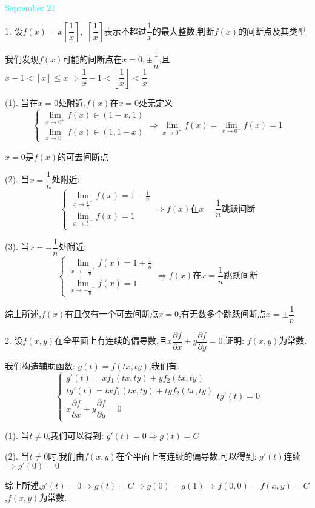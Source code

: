 \textcolor{cyan}{September 21}

1. 设$f(x)=x[\dfrac{1}{x}]$,\ $[\dfrac{1}{x}]$表示不超过$\dfrac{1}{x}$的最大整数,判断$f(x)$的间断点及其类型
\begin{solution}

	我们发现$f(x)$可能的间断点在$x=0,\pm \dfrac{1}{n}$,且$x-1<[x]\leq x\Rightarrow \dfrac{1}{x}-1<[\dfrac{1}{x}]<\dfrac{1}{x}$
	
	(1). 当在$x=0$处附近,$f(x)$在$x=0$处无定义
	$$\left\lbrace
	\begin{array}{l}
		\lim\limits_{x\to 0^{+}}f(x)\in(1-x,1)\\
		\lim\limits_{x\to 0^{-}}f(x)\in(1,1-x)
	\end{array}
	\right. \Rightarrow \lim\limits_{x\to 0^{+}}f(x)=\lim\limits_{x\to 0^{-}}f(x)=1$$
	
	$x=0$是$f(x)$的可去间断点
	
	(2). 当$x=\dfrac{1}{n}$处附近:  
	$$\left\lbrace
	\begin{array}{l}
		\lim\limits_{x\to \frac{1}{n}^{+}}f(x)=1-\frac{1}{n}\\
		\lim\limits_{x\to \frac{1}{n}^{-}}f(x)=1
	\end{array}
	\right. \Rightarrow f(x)\text{在}x=\dfrac{1}{n}\text{跳跃间断}$$
	
	(3). 当$x=-\dfrac{1}{n}$处附近:  
	$$\left\lbrace
	\begin{array}{l}
		\lim\limits_{x\to -\frac{1}{n}^{+}}f(x)=1+\frac{1}{n}\\
		\lim\limits_{x\to -\frac{1}{n}^{-}}f(x)=1
	\end{array}
	\right. \Rightarrow f(x)\text{在}x=\dfrac{1}{n}\text{跳跃间断}$$
	
	综上所述,$f(x)$有且仅有一个可去间断点$x=0$,有无数多个跳跃间断点$x=\pm \dfrac{1}{n}$
\end{solution}

2. 设$f(x,y)$在全平面上有连续的偏导数,且$x\dfrac{\partial f}{\partial x}+y\dfrac{\partial f}{\partial y}=0$,证明:  $f(x,y)$为常数.
\begin{solution}

	我们构造辅助函数:  $g(t)=f(tx,ty)$,我们有:  
	$$\left\lbrace
	\begin{array}{l}
		g'(t)=xf_{1}(tx,ty)+yf_{2}(tx,ty)\\
		tg'(t)=txf_{1}(tx,ty)+tyf_{2}(tx,ty)\\
		x\dfrac{\partial f}{\partial x}+y\dfrac{\partial f}{\partial y}=0
	\end{array}
	\right. tg'(t)=0$$
	
	(1). 当$t\neq 0$,我们可以得到:  $g'(t)=0\Rightarrow g(t)=C$
	
	(2). 当$t\neq 0$时,我们由$f(x,y)$在全平面上有连续的偏导数,可以得到:  $g'(t)$连续$\Rightarrow g'(0)=0$
	
	综上所述,$g'(t)=0\Rightarrow g(t)=C\Rightarrow g(0)=g(1)\Rightarrow f(0,0)=f(x,y)=C$,$f(x,y)$为常数.
\end{solution}

